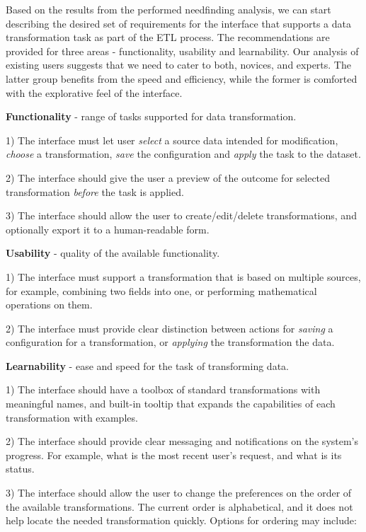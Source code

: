 \documentclass[12pt,letterpaper]{article}
\begin{document}
Based on the results from the performed needfinding analysis, we can start describing the desired set of requirements for the interface that supports a data transformation task as part of the ETL process. The recommendations are provided for three areas - functionality, usability and learnability. Our analysis of existing users suggests that we need to cater to both, novices, and experts. The latter group benefits from the speed and efficiency, while the former is comforted with the explorative feel of the interface.

\bigskip
\textbf{Functionality} - range of tasks supported for data transformation.

1) The interface must let user \textit{select} a source data intended for modification, \textit{choose} a transformation, \textit{save} the configuration and \textit{apply} the task to the dataset.

2) The interface should give the user a preview of the outcome for selected transformation \textit{before} the task is applied.

3) The interface should allow the user to create/edit/delete transformations, and optionally export it to a human-readable form.

\textbf{Usability} - quality of the available functionality.

1) The interface must support a transformation that is based on multiple sources, for example, combining two fields into one, or performing mathematical operations on them.

2) The interface must provide clear distinction between actions for \textit{saving} a configuration for a transformation, or \textit{applying} the transformation the data.

\textbf{Learnability} - ease and speed for the task of transforming data.

1) The interface should have a toolbox of standard transformations with meaningful names, and built-in tooltip that expands the capabilities of each transformation with examples.

2) The interface should provide clear messaging and notifications on the system's progress. For example, what is the most recent user's request, and what is its status.

3) The interface should allow the user to change the preferences on the order of the available transformations. The current order is alphabetical, and it does not help locate the needed transformation quickly. Options for ordering may include: 
\end{document}
